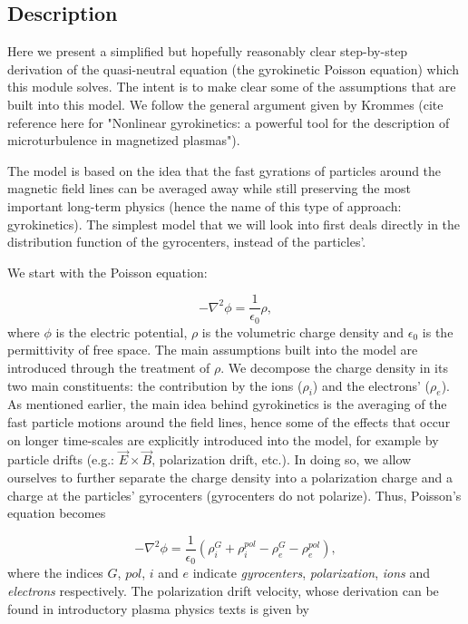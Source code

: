 \documentclass[]{report}   %
\begin{document}
\subsection{Description}
Here we present a simplified but hopefully reasonably clear step-by-step derivation of the quasi-neutral equation (the gyrokinetic Poisson equation) which this module solves. The intent is to make clear some of the assumptions that are built into this model. We follow the general argument given by Krommes (cite reference here for "Nonlinear gyrokinetics: a powerful tool for the description of microturbulence in magnetized plasmas").

The model is based on the idea that the fast gyrations of particles around the magnetic field lines can be averaged away while still preserving the most important long-term physics (hence the name of this type of approach: gyrokinetics). The simplest model that we will look into first deals directly in the distribution function of the gyrocenters, instead of the particles'. 

We start with the Poisson equation:

\begin{equation}
-\nabla ^2 \phi = \frac{1}{\epsilon_0}\rho,
\end{equation}
where $\phi$ is the electric potential, $\rho$ is the volumetric charge density and $\epsilon_0$ is the permittivity of free space. The main assumptions built into the model are introduced through the treatment of $\rho$. We decompose the charge density in its two main constituents: the contribution by the ions ($\rho_i$) and the electrons' ($\rho_e$). As mentioned earlier, the main idea behind gyrokinetics is the averaging of the fast particle motions around the field lines, hence some of the effects that occur on longer time-scales are explicitly introduced into the model, for example by particle drifts (e.g.: $\vec{E}\times\vec{B}$, polarization drift, etc.). In doing so, we allow ourselves to further separate the charge density into a polarization charge and a charge at the particles' gyrocenters (gyrocenters do not polarize). Thus, Poisson's equation becomes

\begin{equation} \label{eq:poisson_2}
-\nabla ^2 \phi = \frac{1}{\epsilon_0}(\rho^G_i + \rho^{pol}_i - \rho^G_e - \rho^{pol}_e),
\end{equation}
where the indices $G$, $pol$, $i$ and $e$ indicate \emph{gyrocenters}, \emph{polarization}, \emph{ions} and \emph{electrons} respectively. The polarization drift velocity, whose derivation can be found in introductory plasma physics texts is given by
\end{document}
